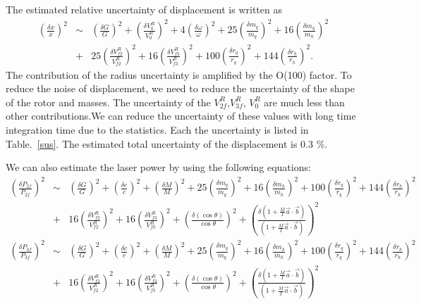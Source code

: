 \documentclass[A4]{spie}  %
\begin{document}
 The estimated relative uncertainty of  displacement is written as
\begin{eqnarray}
\left( \frac{\delta x}{x} \right)^2 &\sim& \left( \frac{\delta G}{G} \right)^2 +\left( \frac{\delta V^R_0}{V^R_0} \right)^2+4\left( \frac{\delta \omega}{\omega} \right)^2+ 25\left( \frac{\delta m_q}{m_q} \right)^2 +16\left( \frac{\delta m_h}{m_h} \right)^2 \nonumber \\
&+&25\left( \frac{\delta V^R_{f2}}{V^R_{f2}} \right)^2+16\left( \frac{\delta V^R_{f3}}{V^R_{f3}} \right)^2+ 100\left( \frac{\delta r_q}{r_q} \right)^2 +144\left( \frac{\delta r_h}{r_h} \right)^2.
\end{eqnarray}
The contribution of the radius uncertainty is amplified by the O(100) factor. To reduce the noise of displacement, we need to reduce the uncertainty of the shape of the rotor and masses.
The uncertainty of the $V^R_{2f}$,$V^R_{3f}$, $V^R_{0}$ are much less than other contributions.We can reduce the uncertainty of these values with long time integration time due to the statistics. Each the uncertainty is listed in Table.~\ref{sus}. The estimated  total uncertainty of the displacement is 0.3 \%.

We can also estimate the laser power by using the following equations:
\begin{eqnarray}
\left( \frac{\delta P_{2f}}{P_{2f}} \right)^2 &\sim& \left( \frac{\delta G}{G} \right)^2 +\left( \frac{\delta c}{c} \right)^2+ \left( \frac{\delta M}{M} \right)^2+25\left( \frac{\delta m_q}{m_q} \right)^2+16\left( \frac{\delta m_h}{m_h} \right)^2 +100\left( \frac{\delta r_q}{r_q} \right)^2+144\left( \frac{\delta r_h}{r_h} \right)^2 \nonumber \\
&+&16\left( \frac{\delta V^R_{f2}}{V^R_{f2}} \right)^2+16\left( \frac{\delta V^R_{f3}}{V^R_{f3}} \right)^2+\left( \frac{\delta (\cos{\theta})}{\cos{\theta}} \right)^2+ \left( \frac{\delta\left( 1+\frac{M}{I}\vec{a}\cdot \vec{b} \right)}{\left( 1+\frac{M}{I}\vec{a}\cdot \vec{b} \right)} \right)^2 \\
\left( \frac{\delta P_{3f}}{P_{3f}} \right)^2 &\sim& \left( \frac{\delta G}{G} \right)^2 +\left( \frac{\delta c}{c} \right)^2+ \left( \frac{\delta M}{M} \right)^2+25\left( \frac{\delta m_q}{m_q} \right)^2+16\left( \frac{\delta m_h}{m_h} \right)^2 +100\left( \frac{\delta r_q}{r_q} \right)^2+144\left( \frac{\delta r_h}{r_h} \right)^2 \nonumber \\
&+&16\left( \frac{\delta V^R_{f2}}{V^R_{f2}} \right)^2+16\left( \frac{\delta V^R_{f3}}{V^R_{f3}} \right)^2+\left( \frac{\delta (\cos{\theta})}{\cos{\theta}} \right)^2+ \left( \frac{\delta\left( 1+\frac{M}{I}\vec{a}\cdot \vec{b} \right)}{\left( 1+\frac{M}{I}\vec{a}\cdot \vec{b} \right)} \right)^2 
\end{eqnarray}
\end{document}
